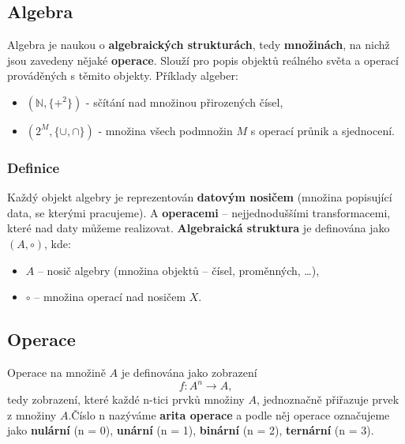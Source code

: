 \subsection{Algebra}
Algebra je naukou o \textbf{algebraických strukturách}, tedy \textbf{množinách}, na nichž jsou zavedeny nějaké \textbf{operace}. Slouží pro popis objektů reálného světa a operací prováděných s těmito objekty. Příklady algeber:
\begin{itemize}
\item $( \mathbb{N} , \{+^2\} )$ - sčítání nad množinou přirozených čísel,
\item $ ( 2^M , \{\cup, \cap\} ) $ - množina všech podmnožin $ M $ s operací průnik a sjednocení.
\end{itemize}

\subsubsection{Definice}
Každý objekt algebry je reprezentován \textbf{datovým nosičem} (množina popisující data, se kterými pracujeme). A \textbf{operacemi} -- nejjednoduššími transformacemi, které nad daty můžeme realizovat. \textbf{Algebraická struktura} je definována jako $(A, \circ)$, kde:
\begin{itemize}
\item $A$ -- nosič algebry (množina objektů -- čísel, proměnných, \ldots),
\item $\circ$ -- množina operací nad nosičem $ X $.
\end{itemize}

\subsection{Operace}
Operace na množině $A$ je definována jako zobrazení 
\begin{equation}
f: A^n \rightarrow A,
\end{equation}
tedy zobrazení, které každé n-tici prvků množiny $A$, jednoznačně přiřazuje prvek z množiny $A$.Číslo n nazýváme \textbf{arita operace} a podle něj operace označujeme jako \textbf{nulární} (n = 0), \textbf{unární} (n = 1), \textbf{binární} (n = 2), \textbf{ternární} (n = 3).

